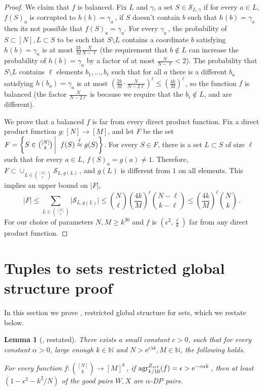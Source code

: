 \documentclass[11pt]{article}
\numberwithin{equation}{section}
\newtheorem{lemma}[theorem]{Lemma}
\theoremstyle{definition}
\theoremstyle{plain}
\newcommand{\eee}{\mathrm e}
\newcommand{\Paren}[1]{\left(#1\right)} %
\newcommand{\abs}[1]{\lvert#1\rvert} %
\newcommand\sett[2]{\left\{ #1 \left| \; \vphantom{#1 #2} \right. #2  \right\}} %
\newcommand\f{f} %
\newcommand\setf{f} %
\newcommand{\g}{g} %
\newcommand\pf{g} %
\newcommand{\test}[2]{
	\ifx &#2&
	\textrm{agr}^{#1}
	\else	
	\textrm{agr}^{#1}_{#2}
	\fi}
\newcommand\neql[1]{\stackrel{{#1}}{ \approx}} %
\newcommand{\sets}{\binom{[N]}{k}} %
\begin{document}
\begin{proof}
	We claim that $\f$ is balanced.
	Fix $L$ and $\gamma$, a set $S\in\mathcal{S}_{L,\gamma}$ if for every $a\in L$, $\f(S)_a$ is corrupted to $h(b)=\gamma_a$\,, if $S$ doesn't contain $b$ such that $h(b)=\gamma_a$ then its not possible that $\f(S)_a = \gamma_a$. For every $\gamma_a$\,, the probability of $S\subset [N], L\subset S$ to be such that $S\setminus L$ contains a coordinate $b$ satisfying $h(b) = \gamma_a$ is at most $\frac{2k}{M}\frac{N}{N-\ell}$ (the requirement that $b\notin L$ can increase the probability of $h(b) = \gamma_a$ by a factor of at most $\frac{N}{N-\ell} < 2$).
	The probability that $S\setminus L$ contains $\ell$ elements $b_1,\ldots, b_\ell$ such that for all $a$ there is a different $b_a$ satisfying $h(b_a) = \gamma_a$ is at most $\Paren{\frac{2k}{M}\cdot\frac{N}{N-2\ell}}^\ell\leq \Paren{\frac{4k}{M}}^\ell$\,, so the function $\f$ is balanced (the factor $\frac{N}{N-2\ell}$ is because we require that the $b_i\notin L$, and are different).
	
	We prove that a balanced $\f$ is far from every direct product function. Fix a direct product function $\g:[N]\rightarrow[M]$, and let $F$ be the set  $F = \sett{S\in \sets }{\f(S)\neql{\ell}\pf(S)}$. For every $S\in F$, there is a set $L\subset S$ of size $\ell$ such that for every $a\in L$, $\f(S)_a = \pf(a)\neq 1$. Therefore, $F\subset \cup_{L\in\binom{[N]}{\ell}}\mathcal{S}_{L,\pf(L)}$\,, and $\pf(L)$ is different from $1$ on all elements. This implies an upper bound on $\abs{F}$,
	\[ \abs{F} \leq \sum_{L\in\binom{[N]}{\ell}}\abs{\mathcal{S}_{L,\pf(L)}}\leq \binom{N}{\ell}\Paren{\frac{4k}{M}}^\ell\binom{N-\ell}{k-\ell}\leq \Paren{\frac{4k}{M}}^\ell \binom{N}{k}\,.\] %
    For our choice of parameters $N,M\geq k^{30}$ and $\f$ is $(\epsilon^2,\frac{\ell}{k})$ far from any direct product function.
\end{proof}

\appendix

	
\section{Tuples to sets restricted global structure proof}
\label{app:tup to sets local}
In this section we prove , restricted global structure for sets, which we restate below.
\begin{lemma}[, restated]
	There exists a small constant $c>0$, such that for every constant $\alpha>0$, large enough $k\in\mathbb{N}$ and $N > \eee^{c\lambda k},M\in\mathbb{N}$, the following holds.
	
	For every function  $\setf:\sets\rightarrow[M]^k$\,, if $\test{Z_{set}}{k/10}(\setf)=\epsilon > \eee^{-c\alpha k}$\,, then  at least $(1-\epsilon^2-
	k^2/N)$ %
	 of the good pairs $W,X$ are $\alpha$-DP pairs.
\end{lemma}
\end{document}
